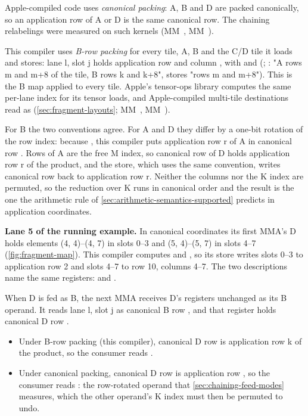 Apple-compiled  code uses \emph{canonical packing}: A, B and D are packed canonically, so an
application row of A or D is the same canonical row. The chaining relabelings were measured on such kernels
(MM~, MM~).

This compiler uses \emph{B-row packing} for every tile, A, B and the C/D tile it loads and stores: lane l, slot j holds
application row  and column , with  and
 (; : "A rows m and m+8 of the tile, B rows k
and k+8", stores "rows m and m+8"). This is the B map applied to every tile. Apple's tensor-ops library computes the same
per-lane index for its tensor loads, and Apple-compiled multi-tile destinations read as 
(\cref{sec:fragment-layouts}; MM~, MM~).

For B the two conventions agree. For A and D they differ by a one-bit rotation of the row index: because
, this compiler puts application row r of A in canonical row .
Rows of A are the free M index, so canonical row  of D holds application row r of
the product, and the store, which uses the same convention, writes canonical row  back to application row
r. Neither the columns nor the K index are permuted, so the reduction over K runs in canonical order and the result is
the one the arithmetic rule of \cref{sec:arithmetic-semantics-supported} predicts in application coordinates.

\textbf{Lane 5 of the running example.} In canonical coordinates its first MMA's D holds elements (4, 4)–(4, 7) in
slots 0–3 and (5, 4)–(5, 7) in slots 4–7 (\cref{fig:fragment-map}). This compiler computes  and
, so its store writes slots 0–3 to application row 2 and slots 4–7 to row 10, columns 4–7. The two
descriptions name the same registers:  and .

When D is fed as B, the next MMA receives D's registers unchanged as its B operand. It reads lane l, slot j as canonical B row , and
that register holds canonical D row .

\begin{itemize}
\item Under B-row packing (this compiler), canonical D row  is application row k of the product, so the
  consumer reads .
\item Under canonical packing, canonical D row  is application row , so the consumer reads
  : the row-rotated operand that \cref{sec:chaining-feed-modes} measures, which the other
  operand's K index must then be permuted to undo.
\end{itemize}

